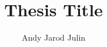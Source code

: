 
\phd %

%
\title{\bf Thesis Title}
\author{Andy Jarod Julin}


\abstract{}

\copyrightpageccbysa %

\acknowledgements{}
\dedication{}


\beforepreface

\figurespage
\tablespage

\afterpreface
